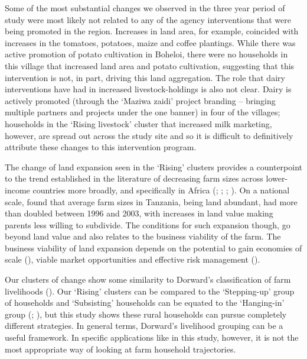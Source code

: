 Some of the most substantial changes we observed in the three year period of study were most likely not related to any of the agency interventions that were being promoted in the region. Increases in land area, for example, coincided with increases in the tomatoes, potatoes, maize and coffee plantings. While there was active promotion of potato cultivation in Boheloi, there were no households in this village that increased land area and potato cultivation, suggesting that this intervention is not, in part, driving this land aggregation. The role that dairy interventions have had in increased livestock-holdings is also not clear. Dairy is actively promoted (through the `Maziwa zaidi' project branding -- bringing multiple partners and projects under the one banner) in four of the villages; households in the `Rising livestock' cluster that increased milk marketing, however, are spread out across the study site and so it is difficult to definitively attribute these changes to this intervention program.

The change of land expansion seen in the `Rising' clusters provides a counterpoint to the trend established in the literature of decreasing farm sizes across lower-income countries more broadly, and specifically in Africa (\citealp{HLPE2013}; \citealp{Jayne2003253}; \citealp{Lowder201616}; \citealp{Masters2013156}). On a national scale, \citet{Jayne2014} found that average farm sizes in Tanzania, being land abundant, had more than doubled between 1996 and 2003, with increases in land value making parents less willing to subdivide. The conditions for such expansion though, go beyond land value and also relates to the business viability of the farm. The business viability of land expansion depends on the potential to gain economies of scale (\citealp{Hazell20101349}), viable market opportunities and effective risk management (\citealp{Harris2014}).

Our clusters of change show some similarity to Dorward's classification of farm livelihoods (\citealp{Dorward2009}). Our `Rising' clusters can be compared to the `Stepping-up' group of households and `Subsisting' households can be equated to the `Hanging-in' group (\citealp{Falconnier2015}; \citealp{Valbuena20151395}), but this study shows these rural households can pursue completely different strategies. In general terms, Dorward's livelihood grouping can be a useful framework. In specific applications like in this study, however, it is not the most appropriate way of looking at farm household trajectories.

